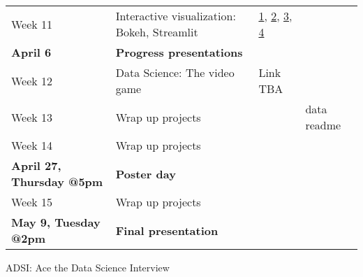 \documentclass[11pt,letter]{article}
\begin{document}
{\begin{tabular}{ L{4.2cm}L{8.2cm}L{3.6cm}L{4.1cm}}
Week 11  &   Interactive visualization: Bokeh, Streamlit  & \href{https://docs.bokeh.org/en/latest/docs/gallery.html}{1}, \href{https://docs.bokeh.org/en/latest/docs/first_steps.html}{2}, \href{https://streamlit.io}{3}, \href{https://streamlit.io/gallery}{4}   & \\
\textbf{April 6}   &   \textbf{Progress presentations}   &  &  \\
Week 12  &   Data Science: The video game  & Link TBA & \\
Week 13  &   Wrap up projects  &  & data readme \\
Week 14  &   Wrap up projects  &  &  \\
\textbf{April 27, Thursday @5pm}  &  \textbf{Poster day}    &  &   \\
Week 15  &   Wrap up projects  &  & \\
\textbf{May 9, Tuesday @2pm}  &  \textbf{Final presentation}    &  &   \\
\bottomrule
\end{tabular}}\vspace{2mm}
{\footnotesize{ADSI: Ace the Data Science Interview}}

\vspace{1cm}

\hspace{-15mm}



\iffalse
\end{document}
